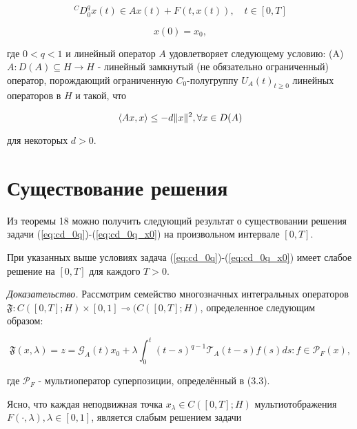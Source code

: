 \begin{equation}
    \label{eq:cd_0q}
    {}^CD_{0}^{q}x(t) \in Ax(t) + F(t, x(t)), \quad t \in [0, T]
\end{equation}

\begin{equation}
    \label{eq:cd_0q_x0}
    x(0) = x_0,
\end{equation}

\noindent где $0 < q < 1$ и линейный оператор $A$ удовлетворяет следующему условию:
(A) $A: D(A) \subseteq H \rightarrow H$ - линейный замкнутый (не обязательно ограниченный) оператор, порождающий ограниченную $C_0$-полугруппу
${U_A(t)}_{t \geq 0}$ линейных операторов в $H$ и такой, что

\begin{equation*}
    \langle Ax, x \rangle \leq -d \lVert x\rVert^2, \forall x \in D(A)
\end{equation*}

\noindent для некоторых $d > 0$.

\section{Существование решения}

Из теоремы 18 можно получить следующий результат о существовании решения задачи (\ref{eq:cd_0q})-(\ref{eq:cd_0q_x0}) на произвольном
интервале $[0, T]$.

\begin{theorem}
    При указанных выше условиях задача (\ref{eq:cd_0q})-(\ref{eq:cd_0q_x0}) имеет слабое решение на $[0, T]$ для каждого $T > 0$.
\end{theorem}

\noindent \textit{Доказательство.} Рассмотрим семейство многозначных интегральных операторов
$\mathfrak{F}: C([0, T]; H) \times [0, 1] \multimap (C([0, T]; H)$, определенное следующим образом:

\begin{equation}
    \label{eq:F_xlambda}
    \mathfrak{F}(x, \lambda) = {z = \mathcal{G}_A (t) x_0 + \lambda \int_0^t (t-s)^{q-1} \mathcal{T}_A (t-s) f(s) ds:
    f \in \mathcal{P}_F (x)},
\end{equation}

\noindent где $\mathcal{P}_F$ - мультиоператор суперпозиции, определённый в (3.3).

Ясно, что каждая неподвижная точка $x_{\lambda} \in C([0, T]; H)$ мультиотображения $F (\cdot, \lambda), \lambda \in [0, 1]$,
является слабым решением задачи

